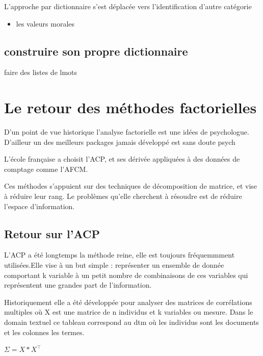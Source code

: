 \documentclass[
]{book}
\providecommand{\tightlist}{%
  \setlength{\itemsep}{0pt}\setlength{\parskip}{0pt}}
\begin{document}
L'approche par dictionnaire s'est déplacée vers l'identification d'autre catégorie

\begin{itemize}
\tightlist
\item
  les valeurs morales
\end{itemize}

\hypertarget{construire-son-propre-dictionnaire}{%
\section{construire son propre dictionnaire}\label{construire-son-propre-dictionnaire}}

faire des listes de lmots

\hypertarget{le-retour-des-muxe9thodes-factorielles}{%
\chapter{Le retour des méthodes factorielles}\label{le-retour-des-muxe9thodes-factorielles}}

D'un point de vue historique l'analyse factorielle est une idées de psychologue. D'ailleur un des meilleurs packages jamais développé est sans doute psych

L'école française a choisit l'ACP, et ses dérivée appliquées à des données de comptage comme l'AFCM.

Ces méthodes s'appuient sur des techniques de décomposition de matrice, et vise à réduire leur rang. Le problèmes qu'elle cherchent à résoudre est de réduire l'espace d'information.

\hypertarget{retour-sur-lacp}{%
\section{Retour sur l'ACP}\label{retour-sur-lacp}}

L'ACP a été longtemps la méthode reine, elle est toujours fréquemmment utilisées.Elle vise à un but simple : représenter un ensemble de donnée comportant k variable à un petit nombre de combinaisons de ces variables qui représentent une grandes part de l'information.

Historiquement elle a été développée pour analyser des matrices de corrélations multiples où X est une matrice de n individus et k variables ou mesure. Dans le domain textuel ce tableau correspond au dtm où les individus sont les documents et les colonnes les termes.

\(\Sigma=X*X^\top\)
\end{document}
